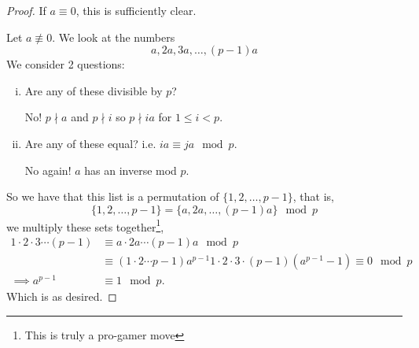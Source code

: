 \begin{proof}
    If $a\equiv 0$, this is sufficiently clear.

    Let $a\not\equiv 0$. We look at the numbers
    \[a, 2a, 3a, \dots, (p-1)a\]
    We consider 2 questions:
    \begin{enumerate}[i.]
        \item Are any of these divisible by $p$?

              No! $p\nmid a$ and $p\nmid i$ so $p\nmid ia$ for $1\leq i < p$.
        \item Are any of these equal? i.e. $ia\equiv ja\mod p$.

              No again! $a$ has an inverse mod $p$.
    \end{enumerate}
    So we have that this list is a permutation of $\{1, 2, \dots, p-1\}$, that is,
    \[\{1, 2, \dots, p-1\} = \{a, 2a, \dots, (p-1)a\}\mod p\]
    we multiply these sets together\footnote{This is truly a pro-gamer move},
    \begin{align*}
        1\cdot 2\cdot 3\cdots (p-1) & \equiv a\cdot 2a\cdots (p-1)a \mod p \\
                                    & \equiv (1\cdot 2\cdots p-1)a^{p-1}
        1\cdot 2\cdot 3\cdot (p-1)(a^{p-1}-1)\equiv 0\mod p                \\\implies a^{p-1}&\equiv 1\mod p.
    \end{align*}
    Which is as desired.
\end{proof}
